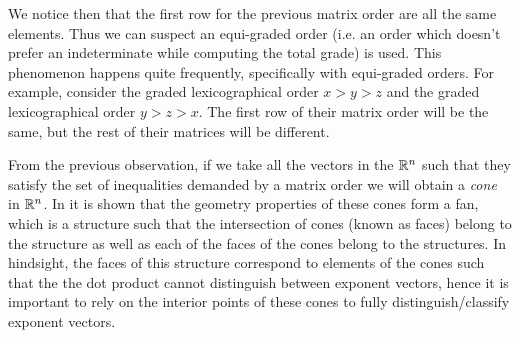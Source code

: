 We notice then that the first row for the previous matrix order are all the same elements. Thus we can suspect
an equi-graded order (i.e. an order which doesn't prefer an indeterminate while computing the total
grade) is used. This phenomenon happens quite frequently, specifically with equi-graded orders. For example,
consider the graded lexicographical order $x > y > z$ and the graded lexicographical order $y > z > x$. The first
row of their matrix order will be the same, but the rest of their matrices will be different.

From the previous observation, if we take all the vectors in the $\mathbb{R}^n$ such that they satisfy the set of
inequalities demanded by a matrix order we will obtain a \emph{cone} in $\mathbb{R}^n$. In \cite{Cox:2014} it is
shown that the geometry properties of these cones form a fan, which is a structure such that the intersection
of cones (known as faces) belong to the structure as well as each of the faces of the cones belong to the
structures. In hindsight, the faces of this structure correspond to elements of the cones such that the
the dot product cannot distinguish between exponent vectors, hence it is important to rely on the interior
points of these cones to fully distinguish/classify exponent vectors. 

